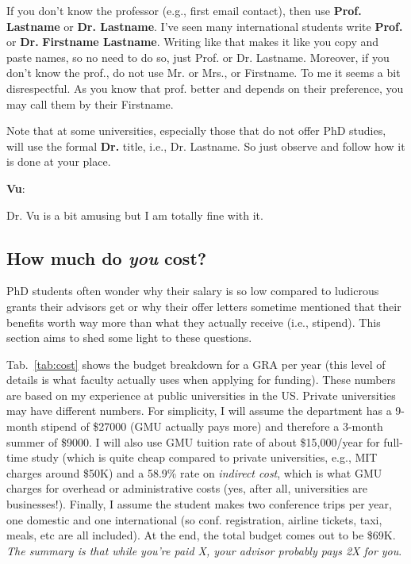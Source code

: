 \documentclass[11pt]{article}
\newenvironment{commentbox}[1][]{
\small
    \begin{cbox}
    \textbf{#1}: 
 }{
   \end{cbox}
}
\begin{document}
If you don't know the professor (e.g., first email contact), then use \textbf{Prof. Lastname} or \textbf{Dr. Lastname}. I've seen many international students write \textbf{Prof.} or \textbf{Dr.} \textbf{Firstname Lastname}.  Writing like that makes it like you copy and paste names, so no need to do so,  just Prof. or Dr. Lastname.
Moreover, if you don't know the prof., do not use Mr. or Mrs., or Firstname. To me it seems a bit disrespectful. As you know that prof. better and depends on their preference, you may call them by their Firstname.

Note that at some universities, especially those that do not offer PhD studies, will use the formal \textbf{Dr.} title, i.e., Dr. Lastname.  So just observe and follow how it is done at your place.


\begin{commentbox}[Vu]
Dr. Vu is a bit amusing but I am totally fine with it.
\end{commentbox}



\subsection{How much do \emph{you} cost?}\label{sec:ra-cost}
PhD students often wonder why their salary is so low compared to ludicrous grants their advisors get or why their offer letters sometime mentioned that their benefits worth way more than what they actually receive (i.e., stipend).  This section aims to shed some light to these questions.

Tab.~\ref{tab:cost} shows the budget breakdown for a GRA per year (this level of details is what faculty actually uses when applying for funding).
These numbers are based on my experience at public universities in the US.  Private universities may have different numbers.  For simplicity, I will assume the department has a 9-month stipend of \$27000 (GMU actually pays more) and therefore a 3-month summer of \$9000. I will also use GMU tuition rate of about \$15,000/year for full-time study (which is quite cheap compared to private universities, e.g., MIT charges around \$50K) and a 58.9\% rate on \emph{indirect cost}, which is what GMU charges for overhead or administrative costs (yes, after all, universities are businesses!).  Finally, I assume the student makes two conference trips per year, one domestic and one international (so conf. registration, airline tickets, taxi, meals, etc are all included). At the end, the total budget comes out to be \$69K. \emph{The summary is that while you're paid X, your advisor probably pays 2X for you}.
\end{document}
